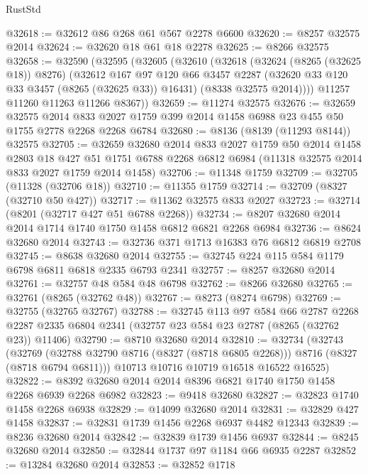 \begin{lexlean}{RustStd}
\begin{coremodule}
{\begin{coremodule}
{{{{{{{{{{{{{{{{{{{{{{{{{{{{{{{{{{{{{{{{{{{{{{{{{{{{{{@32618 := @32612 @86 @268 @61 @567 @2278 @6600
@32620 := @8257 @32575 @2014
@32624 := @32620 @18 @61 @18 @2278
@32625 := @8266 @32575
@32658 := @32590
    (@32595
      (@32605
        (@32610
          (@32618
            (@32624 (@8265 (@32625 @18)) @8276)
            (@32612
              @167
              @97
              @120
              @66
              @3457
              @2287
              (@32620 @33 @120 @33 @3457 (@8265 (@32625 @33)) @16431)
              (@8338 @32575 @2014))))
        @11257
        @11260
        @11263
        @11266
        @8367))
@32659 := @11274 @32575
@32676 := @32659
    @32575
    @2014
    @833
    @2027
    @1759
    @399
    @2014
    @1458
    @6988
    @23
    @455
    @50
    @1755
    @2778
    @2268
    @2268
    @6784
@32680 := @8136 (@8139 (@11293 @8144)) @32575
@32705 := @32659
    @32680
    @2014
    @833
    @2027
    @1759
    @50
    @2014
    @1458
    @2803
    @18
    @427
    @51
    @1751
    @6788
    @2268
    @6812
    @6984
    (@11318 @32575 @2014 @833 @2027 @1759 @2014 @1458)
@32706 := @11348 @1759
@32709 := @32705 (@11328 (@32706 @18))
@32710 := @11355 @1759
@32714 := @32709 (@8327 (@32710 @50 @427))
@32717 := @11362 @32575 @833 @2027
@32723 := @32714 (@8201 (@32717 @427 @51 @6788 @2268))
@32734 := @8207 @32680 @2014 @2014 @1714 @1740 @1750 @1458 @6812 @6821 @2268 @6984
@32736 := @8624 @32680 @2014
@32743 := @32736 @371 @1713 @16383 @76 @6812 @6819 @2708
@32745 := @8638 @32680 @2014
@32755 := @32745 @224 @115 @584 @1179 @6798 @6811 @6818 @2335 @6793 @2341
@32757 := @8257 @32680 @2014
@32761 := @32757 @48 @584 @48 @6798
@32762 := @8266 @32680
@32765 := @32761 (@8265 (@32762 @48))
@32767 := @8273 (@8274 @6798)
@32769 := @32755 (@32765 @32767)
@32788 := @32745
    @113
    @97
    @584
    @66
    @2787
    @2268
    @2287
    @2335
    @6804
    @2341
    (@32757 @23 @584 @23 @2787 (@8265 (@32762 @23)) @11406)
@32790 := @8710 @32680 @2014
@32810 := @32734
    (@32743
      (@32769 (@32788 @32790 @8716 (@8327 (@8718 @6805 @2268))) @8716 (@8327 (@8718 @6794 @6811)))
      @10713
      @10716
      @10719
      @16518
      @16522
      @16525)
@32822 := @8392 @32680 @2014 @2014 @8396 @6821 @1740 @1750 @1458 @2268 @6939 @2268 @6982
@32823 := @9418 @32680
@32827 := @32823 @1740 @1458 @2268 @6938
@32829 := @14099 @32680 @2014
@32831 := @32829 @427 @1458
@32837 := @32831 @1739 @1456 @2268 @6937 @4482 @12343
@32839 := @8236 @32680 @2014
@32842 := @32839 @1739 @1456 @6937
@32844 := @8245 @32680 @2014
@32850 := @32844 @1737 @97 @1184 @66 @6935 @2287
@32852 := @13284 @32680 @2014
@32853 := @32852 @1718
}}}}}}}}}}}}}}}}}}}}}}}}}}}}}}}}}}}}}}}}}}}}}}}}}}}}}}
\end{coremodule}}
\end{coremodule}
\end{lexlean}
